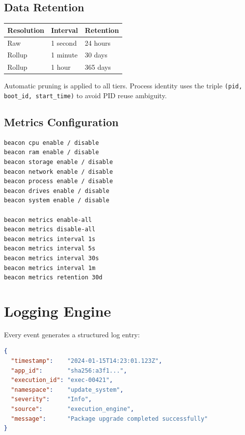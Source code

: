 \documentclass[12pt,a4paper]{article}
\begin{document}
\subsection{Data Retention}

\begin{center}
\begin{tabular}{lll}
\toprule
Resolution & Interval & Retention \\
\midrule
Raw        & 1 second  & 24 hours \\
Rollup     & 1 minute  & 30 days \\
Rollup     & 1 hour    & 365 days \\
\bottomrule
\end{tabular}
\end{center}

Automatic pruning is applied to all tiers. Process identity uses the triple \texttt{(pid, boot\_id, start\_time)} to avoid PID reuse ambiguity.

\subsection{Metrics Configuration}

\begin{lstlisting}[language=bash, caption={Metrics management commands}]
beacon cpu enable / disable
beacon ram enable / disable
beacon storage enable / disable
beacon network enable / disable
beacon process enable / disable
beacon drives enable / disable
beacon system enable / disable

beacon metrics enable-all
beacon metrics disable-all
beacon metrics interval 1s
beacon metrics interval 5s
beacon metrics interval 30s
beacon metrics interval 1m
beacon metrics retention 30d
\end{lstlisting}

\section{Logging Engine}

Every event generates a structured log entry:

\begin{lstlisting}[language=json, caption={Log entry schema}]
{
  "timestamp":    "2024-01-15T14:23:01.123Z",
  "app_id":       "sha256:a3f1...",
  "execution_id": "exec-00421",
  "namespace":    "update_system",
  "severity":     "Info",
  "source":       "execution_engine",
  "message":      "Package upgrade completed successfully"
}
\end{lstlisting}
\end{document}
